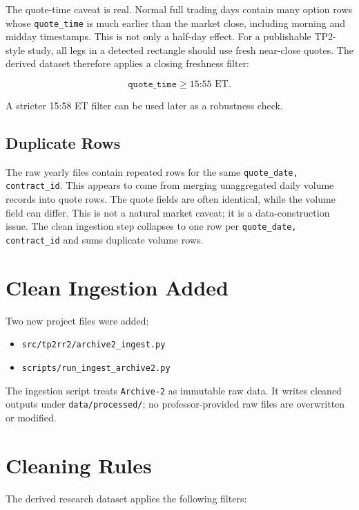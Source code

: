 \documentclass[11pt]{article}
\begin{document}
The quote-time caveat is real. Normal full trading days contain many option rows
whose \texttt{quote\_time} is much earlier than the market close, including
morning and midday timestamps. This is not only a half-day effect. For a
publishable TP2-style study, all legs in a detected rectangle should use fresh
near-close quotes. The derived dataset therefore applies a closing freshness
filter:

\[
\texttt{quote\_time} \geq \text{15:55 ET}.
\]

A stricter 15:58 ET filter can be used later as a robustness check.

\subsection*{Duplicate Rows}

The raw yearly files contain repeated rows for the same
\texttt{quote\_date, contract\_id}. This appears to come from merging
unaggregated daily volume records into quote rows. The quote fields are often
identical, while the volume field can differ. This is not a natural market
caveat; it is a data-construction issue. The clean ingestion step collapses to
one row per \texttt{quote\_date, contract\_id} and sums duplicate volume rows.

\section*{Clean Ingestion Added}

Two new project files were added:

\begin{itemize}
  \item \texttt{src/tp2rr2/archive2\_ingest.py}
  \item \texttt{scripts/run\_ingest\_archive2.py}
\end{itemize}

The ingestion script treats \texttt{Archive-2} as immutable raw data. It writes
cleaned outputs under \texttt{data/processed/}; no professor-provided raw files
are overwritten or modified.

\section*{Cleaning Rules}

The derived research dataset applies the following filters:
\end{document}
